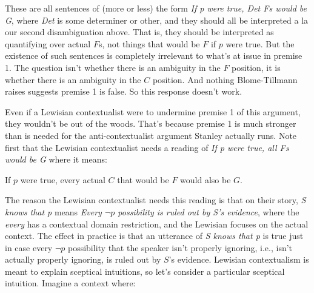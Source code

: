 
\noindent These are all sentences of (more or less) the form \textit{If p were true, Det Fs would be G}, where \textit{Det} is some determiner or other, and they should all be interpreted a la our second disambiguation above. That is, they should be interpreted as quantifying over actual \(F\)s, not things that would be \(F\) if \(p\) were true. But the existence of such sentences is completely irrelevant to what's at issue in premise 1. The question isn't whether there is an ambiguity in the \(F\) position, it is whether there is an ambiguity in the \(C\) position. And nothing Blome-Tillmann raises suggests premise 1 is false. So this response doesn't work.

Even if a Lewisian contextualist were to undermine premise 1 of this argument, they wouldn't be out of the woods. That's because premise 1 is much stronger than is needed for the anti-contextualist argument Stanley actually runs. Note first that the Lewisian contextualist needs a reading of \textit{If p were true, all Fs would be G} where it means:

\begin{itemize*}
\item If \(p\) were true, every actual \(C\) that would be \(F\) would also be \(G\).
\end{itemize*}

\noindent The reason the Lewisian contextualist needs this reading is that on their story, \textit{S knows that p} means \textit{Every $\neg p$ possibility is ruled out by S's evidence}, where the \textit{every} has a contextual domain restriction, and the Lewisian focuses on the actual context. The effect in practice is that an utterance of \textit{S knows that p} is true just in case every $\neg p$ possibility that the speaker isn't properly ignoring, i.e., isn't actually properly ignoring, is ruled out by \(S\)'s evidence. Lewisian contextualism is meant to explain sceptical intuitions, so let's consider a particular sceptical intuition. Imagine a context where:

